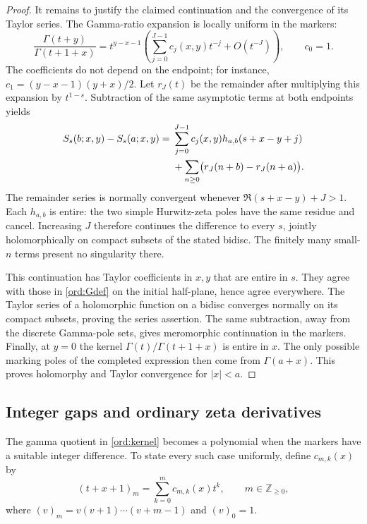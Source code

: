 \begin{proof}
It remains to justify the claimed continuation and the convergence
of its Taylor series.  The Gamma-ratio expansion
\cite[\S5.11(iii)]{DLMF} is locally uniform in the markers:
\[
 \frac{\Gamma(t+y)}{\Gamma(t+1+x)}
  =t^{y-x-1}
    \left(\sum_{j=0}^{J-1}c_j(x,y)t^{-j}+O(t^{-J})\right),
 \qquad c_0=1.
\]
The coefficients do not depend on the endpoint; for instance,
$c_1=(y-x-1)(y+x)/2$.  Let $r_J(t)$ be the remainder after multiplying
this expansion by $t^{1-s}$.  Subtraction of the same asymptotic terms
at both endpoints yields
\begin{align}
 S_s(b;x,y)-S_s(a;x,y)
  ={}&\sum_{j=0}^{J-1}c_j(x,y)h_{a,b}(s+x-y+j)\notag\\
    &+\sum_{n\ge0}\bigl(r_J(n+b)-r_J(n+a)\bigr).
 \label{ord:subtract}
\end{align}
The remainder series is normally convergent whenever
$\Re(s+x-y)+J>1$.  Each $h_{a,b}$ is entire: the two simple Hurwitz-zeta
poles have the same residue and cancel.  Increasing $J$ therefore
continues the difference to every $s$, jointly holomorphically on
compact subsets of the stated bidisc.  The finitely many small-$n$
terms present no singularity there.

This continuation has Taylor coefficients in $x,y$ that are entire in
$s$.  They agree with those in \eqref{ord:Gdef} on the initial
half-plane, hence agree everywhere.  The Taylor series of a holomorphic
function on a bidisc converges normally on its compact subsets, proving
the series assertion.  The same subtraction, away from the discrete
Gamma-pole sets, gives meromorphic continuation in the markers.
Finally, at $y=0$ the kernel
$\Gamma(t)/\Gamma(t+1+x)$ is entire in $x$.  The only possible marking
poles of the completed expression then come from $\Gamma(a+x)$.
This proves holomorphy and Taylor convergence for $|x|<a$.
\end{proof}

\subsection{Integer gaps and ordinary zeta derivatives}

The gamma quotient in \eqref{ord:kernel} becomes a polynomial when
the markers have a suitable integer difference.  To state every such
case uniformly, define $c_{m,k}(x)$ by
\[
          (t+x+1)_m=\sum_{k=0}^m c_{m,k}(x)t^k,
 \qquad m\in\mathbb Z_{\ge0},
\]
where $(v)_m=v(v+1)\cdots(v+m-1)$ and $(v)_0=1$.

